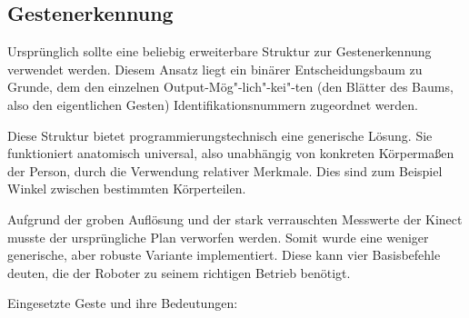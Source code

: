\subsection{Gestenerkennung}
\label{gestenerkennung_gestenerkennung_sec}
\authorsection{\editormarton}

Ursprünglich sollte eine beliebig erweiterbare Struktur zur Gestenerkennung verwendet werden.
 Diesem Ansatz liegt ein binärer Entscheidungsbaum zu Grunde, dem den einzelnen
 Output-Mög"-lich"-kei"-ten (den Blätter des Baums, also den eigentlichen
 Gesten) Identifikationsnummern zugeordnet werden.

Diese Struktur bietet programmierungstechnisch eine generische Lösung. Sie funktioniert anatomisch universal,
 also unabhängig von konkreten Körpermaßen der Person, durch die Verwendung relativer Merkmale.
 Dies sind zum Beispiel Winkel zwischen bestimmten Körperteilen.
 
Aufgrund der groben Auflösung und der stark verrauschten Messwerte der Kinect musste der ursprüngliche Plan verworfen werden.
 Somit wurde eine weniger generische, aber robuste Variante implementiert. Diese kann vier Basisbefehle deuten, die der Roboter zu seinem richtigen Betrieb benötigt.
\vspace{0.3cm}

\noindent Eingesetzte Geste und ihre Bedeutungen:

